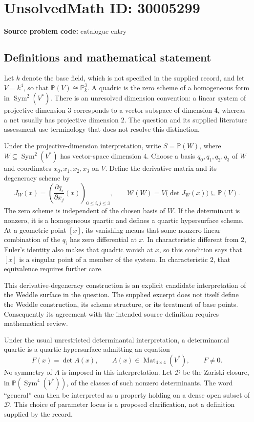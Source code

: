 \documentclass[11pt]{article}
\newcommand{\PP}{\mathbb{P}}
\begin{document}
\section*{UnsolvedMath ID: 30005299}
\textbf{Source problem code:} catalogue entry
\subsection{Definitions and mathematical statement}
Let \(k\) denote the base field, which is not specified in the supplied record, and let \(V=k^4\), so that \(\PP(V)\cong\PP^3_k\). A quadric is the zero scheme of a homogeneous form in \(\operatorname{Sym}^2(V^*)\). There is an unresolved dimension convention: a linear system of projective dimension \(3\) corresponds to a vector subspace of dimension \(4\), whereas a net usually has projective dimension \(2\). The question and its supplied literature assessment use terminology that does not resolve this distinction.

Under the projective-dimension interpretation, write \(S=\PP(W)\), where \(W\subseteq\operatorname{Sym}^2(V^*)\) has vector-space dimension \(4\). Choose a basis \(q_0,q_1,q_2,q_3\) of \(W\) and coordinates \(x_0,x_1,x_2,x_3\) on \(V\). Define the derivative matrix and its degeneracy scheme by
\[
J_W(x)=\left(\frac{\partial q_i}{\partial x_j}(x)\right)_{0\leq i,j\leq3},\qquad
\mathcal W(W)=V\bigl(\det J_W(x)\bigr)\subseteq\PP(V).
\]
The zero scheme is independent of the chosen basis of \(W\). If the determinant is nonzero, it is a homogeneous quartic and defines a quartic hypersurface scheme. At a geometric point \([x]\), its vanishing means that some nonzero linear combination of the \(q_i\) has zero differential at \(x\). In characteristic different from \(2\), Euler's identity also makes that quadric vanish at \(x\), so this condition says that \([x]\) is a singular point of a member of the system. In characteristic \(2\), that equivalence requires further care.

This derivative-degeneracy construction is an explicit candidate interpretation of the Weddle surface in the question. The supplied excerpt does not itself define the Weddle construction, its scheme structure, or its treatment of base points. Consequently its agreement with the intended source definition requires mathematical review.

Under the usual unrestricted determinantal interpretation, a determinantal quartic is a quartic hypersurface admitting an equation
\[
F(x)=\det A(x),\qquad A(x)\in\operatorname{Mat}_{4\times4}(V^*),\qquad F\ne0.
\]
No symmetry of \(A\) is imposed in this interpretation. Let \(\mathcal D\) be the Zariski closure, in \(\PP(\operatorname{Sym}^4(V^*))\), of the classes of such nonzero determinants. The word ``general'' can then be interpreted as a property holding on a dense open subset of \(\mathcal D\). This choice of parameter locus is a proposed clarification, not a definition supplied by the record.
\end{document}

